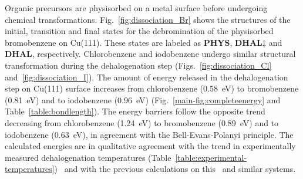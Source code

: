 \documentclass[journal=jpclcd,layout=traditional,manuscript=letter]{achemso} %
\newcommand{\sinfo}{Supporting Information}
\begin{document}
Organic precursors are physisorbed on a metal surface before undergoing chemical transformations. 
%
Fig.~\ref{fig:dissociation_Br} shows the structures of the initial, transition and final states for the debromination of the physisorbed bromobenzene on Cu(111). These states are labeled as \textbf{PHYS}, \textbf{DHAL$\ddagger$} and \textbf{DHAL}, respectively. Chlorobenzene and iodobenzene undergo similar structural transformation during the dehalogenation step (Figs.~\ref{fig:dissociation_Cl} and~\ref{fig:dissociation_I}).
%
%
The amount of energy released in the dehalogenation step on Cu(111) surface increases from chlorobenzene (\SI{0.58}{\electronvolt}) to bromobenzene (\SI{0.81}{\electronvolt}) and to iodobenzene (\SI{0.96}{\electronvolt}) (Fig.~\ref{main-fig:completeenergy} and Table~\ref{table:bondlength}).
The energy barriers follow the opposite trend decreasing from chlorobenzene (\SI{1.24}{\electronvolt}) to bromobenzene (\SI{0.89}{\electronvolt}) and to iodobenzene (\SI{0.63}{\electronvolt}), in agreement with the Bell-Evans-Polanyi principle.
The calculated energies are in qualitative agreement with the trend in experimentally measured dehalogenation temperatures (Table~\ref{table:experimental-temperatures})~\cite{ullmann_52,ullmann_87,ullmann_67} and with the previous calculations on this~\cite{jacs2013} and similar systems.
\end{document}
